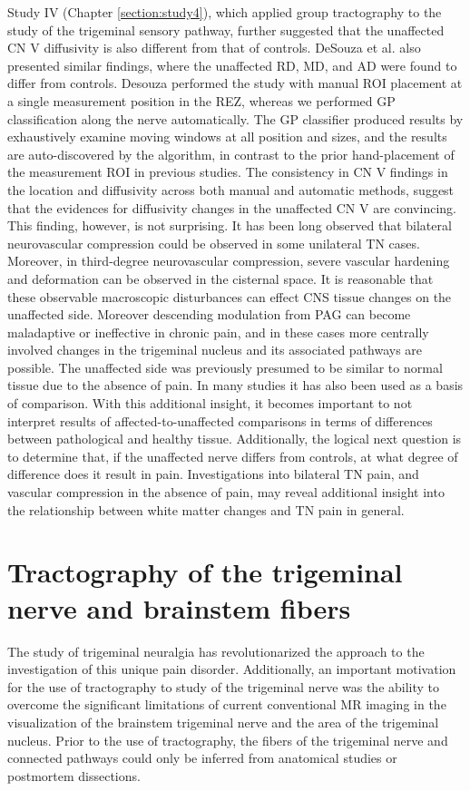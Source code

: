Study IV (Chapter \ref{section:study4}), which applied group tractography to the study of the trigeminal sensory pathway, further suggested that the unaffected CN V diffusivity is also different from that of controls. DeSouza et al. \cite{Desouza2013} also presented similar findings, where the unaffected RD, MD, and AD were found to differ from controls. Desouza performed the study with manual ROI placement at a single measurement position in the REZ, whereas we performed GP classification along the nerve automatically. The GP classifier produced results by exhaustively examine moving windows at all position and sizes, and the results are auto-discovered by the algorithm, in contrast to the prior hand-placement of the measurement ROI in previous studies. The consistency in CN V findings in the location and diffusivity across both manual and automatic methods, suggest that the evidences for diffusivity changes in the unaffected CN V are convincing. This finding, however, is not surprising. It has been long observed that bilateral neurovascular compression could be observed in some unilateral TN cases. Moreover, in third-degree neurovascular compression, severe vascular hardening and deformation can be observed in the cisternal space. It is reasonable that these observable macroscopic disturbances can effect CNS tissue changes on the unaffected side. Moreover descending modulation from PAG can become maladaptive or ineffective in chronic pain, and in these cases more centrally involved changes in the trigeminal nucleus and its associated pathways are possible.
The unaffected side was previously presumed to be similar to normal tissue due to the absence of pain. In many studies it has also been used as a basis of comparison. With this additional insight, it becomes important to not interpret results of affected-to-unaffected comparisons in terms of differences between pathological and healthy tissue. Additionally, the logical next question is to determine that, if the unaffected nerve differs from controls, at what degree of difference does it result in pain. Investigations into bilateral TN pain, and vascular compression in the absence of pain, may reveal additional insight into the relationship between white matter changes and TN pain in general.

\section{Tractography of the trigeminal nerve and brainstem fibers}

The study of trigeminal neuralgia has revolutionarized the approach to the investigation of this unique pain disorder. Additionally, an important motivation for the use of tractography to study of the trigeminal nerve was the ability to overcome the significant limitations of current conventional MR imaging in the visualization of the brainstem trigeminal nerve and the area of the trigeminal nucleus. Prior to the use of tractography, the fibers of the trigeminal nerve and connected pathways could only be inferred from anatomical studies or postmortem dissections. 

